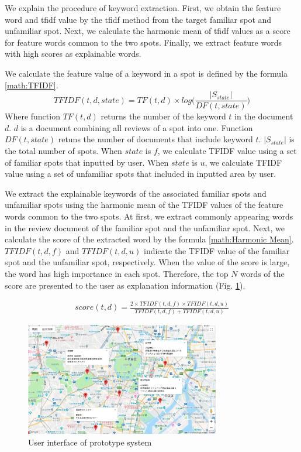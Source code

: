 \documentclass[journal]{IAENGtran}
\begin{document}
We explain the procedure of keyword extraction. First, we obtain the feature word and tfidf value by the tfidf method from the target familiar spot and unfamiliar spot. Next, we calculate the harmonic mean of tfidf values as a score for feature words common to the two spots. Finally, we extract feature words with high scores as explainable words.

We calculate the feature value of a keyword in a spot is defined by the formula \ref{math:TFIDF}.
\begin{equation}
  TFIDF(t,d,state) = TF(t,d) \times log\Biggr(\frac{|S_{state}|}{DF(t,state)}\Biggr)
  \label{math:TFIDF}
\end{equation}
Where function $TF(t,d)$ returns the number of the keyword $t$ in the document $d$.
$d$ is a document combining all reviews of a spot into one.
Function $DF(t,state)$ retuns the number of documents that include keyword $t$.
$|S_{state}|$ is the total number of spots.
When $state$ is $f$, we calculate TFIDF value using a set of familiar spots that inputted by user.
When $state$ is $u$, we calculate TFIDF value using a set of unfamiliar spots that included in inputted area by user.

We extract the explainable keywords of the associated familiar spots and unfamiliar spots using the harmonic mean of the TFIDF values of the feature words common to the two spots.
At first, we extract commonly appearing words in the review document of the familiar spot and the unfamiliar spot.
Next, we calculate the score of the extracted word by the formula \ref{math:Harmonic Mean}.
$TFIDF(t,d,f)$ and $TFIDF(t,d,u)$ indicate the TFIDF value of the familiar spot and the unfamiliar spot, respectively.
When the value of the score is large, the word has high importance in each spot.
Therefore, the top $N$ words of the score are presented to the user as explanation information (Fig. \ref{fig:photo_map}).

\begin{eqnarray}
  score(t,d) = \frac{2 \times TFIDF(t,d,f) \times TFIDF(t,d,u)}{TFIDF(t,d,f) + TFIDF(t,d,u)}
  \label{math:Harmonic Mean}
\end{eqnarray}

\begin{figure}[t]
  \begin{center}
    \includegraphics[clip,width=8.5cm,bb=0 0 1289 750]{picture/Photo_Map.png}
    \caption{User interface of prototype system}
    \label{fig:photo_map}
   \end{center}
\end{figure}
\end{document}
